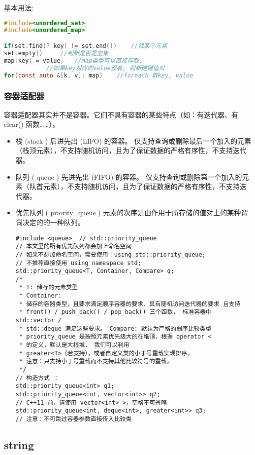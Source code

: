 \documentclass[UTF8]{ctexart}
\begin{document}
基本用法:
\begin{lstlisting}[language=C]
#include<unordered_set>
#include<unordered_map>

if(set.find(? key) != set.end())    //找某个元素
set.empty()     //判断是否是空集
map[key] = value;   //map类型可以直接存取, 
            //如果key对应的value没有, 则新建键值对
for(const auto &[k, v]: map)    //foreach 取key, value
\end{lstlisting}
\subsubsection{容器适配器}

容器适配器其实并不是容器。它们不具有容器的某些特点（如：有迭代器、有 clear() 函数……）。
\begin{itemize}
\item 栈 (stack ) 后进先出 (LIFO) 的容器。
仅支持查询或删除最后一个加入的元素（栈顶元素），不支持随机访问，且为了保证数据的严格有序性，不支持迭代器。

\item 队列 ( queue ) 先进先出 (FIFO) 的容器。
    仅支持查询或删除第一个加入的元素（队首元素），不支持随机访问，且为了保证数据的严格有序性，不支持迭代器。

\item 优先队列 ( priority\_queue ) 元素的次序是由作用于所存储的值对上的某种谓词决定的的一种队列。
\begin{lstlisting}
#include <queue>  // std::priority_queue
// 本文里的所有优先队列都会加上命名空间
// 如果不想加命名空间，需要使用：using std::priority_queue;
// 不推荐直接使用 using namespace std;
std::priority_queue<T, Container, Compare> q;
/*
 * T: 储存的元素类型
 * Container:
 * 储存的容器类型，且要求满足顺序容器的要求、具有随机访问迭代器的要求 且支持
 * front() / push_back() / pop_back() 三个函数， 标准容器中 std::vector /
 * std::deque 满足这些要求。 Compare: 默认为严格的弱序比较类型
 * priority_queue 是按照元素优先级大的在堆顶，根据 operator <
 * 的定义，默认是大根堆， 我们可以利用
 * greater<T>（若支持），或者自定义类的小于号重载实现排序。
 * 注意：只支持小于号重载而不支持其他比较符号的重载。
 */
// 构造方式 ：
std::priority_queue<int> q1;
std::priority_queue<int, vector<int>> q2;
// C++11 前，请使用 vector<int> >，空格不可省略
std::priority_queue<int, deque<int>, greater<int>> q3;
// 注意：不可跳过容器参数直接传入比较类
\end{lstlisting}
\end{itemize}


\subsection{string}
\end{document}
